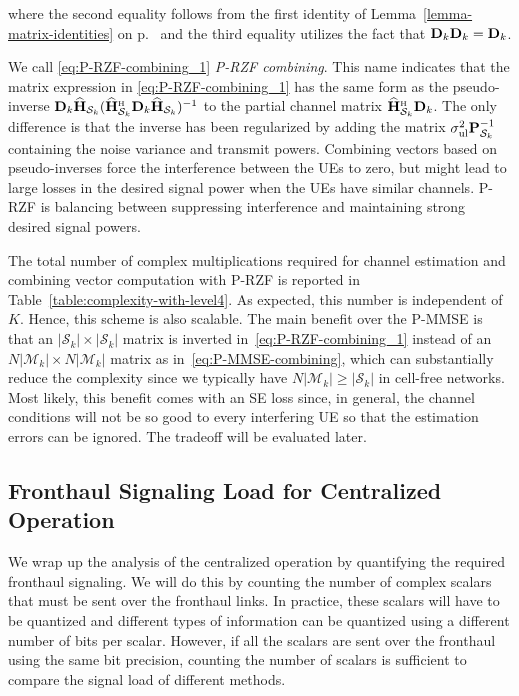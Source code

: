 where the second equality follows from the first identity of Lemma~\ref{lemma-matrix-identities} on p.~\pageref{lemma-matrix-identities} and the third equality utilizes the fact that $\mathbf{{D}}_{k}\mathbf{{D}}_{k} = \mathbf{{D}}_{k}$.

We call \eqref{eq:P-RZF-combining_1} \emph{\gls{P-RZF} combining}. 
This name indicates that the matrix expression in \eqref{eq:P-RZF-combining_1} has the same form as the pseudo-inverse $\vect{{D}}_{k}\vect{\widehat{H}}_{\mathcal{S}_k}( \vect{\widehat{H}}^{\Htran}_{\mathcal{S}_k}\vect{{D}}_{k}\vect{\widehat{H}}_{\mathcal{S}_k} )^{-1}$ to the partial channel matrix $\vect{\widehat{H}}_{\mathcal{S}_k}^{\Htran} \vect{{D}}_{k}$. The only difference is that the inverse has been regularized by adding the matrix $\sigma^2_{\mathrm{ul}} \mathbf{{P}}_{\mathcal{S}_k}^{-1}$ containing the noise variance and transmit powers. Combining vectors based on pseudo-inverses force the interference between the UEs to zero, but might lead to large losses in the desired signal power when the UEs have similar channels. P-RZF is balancing between suppressing interference and maintaining strong desired signal powers.

The total number of complex multiplications required for channel estimation and combining vector computation with P-RZF is reported in Table~\ref{table:complexity-with-level4}. As expected, this number is independent of $K$. Hence, this scheme is also scalable. The main benefit over the P-MMSE is that an $|\mathcal{S}_k| \times |\mathcal{S}_k|$ matrix is inverted in~\eqref{eq:P-RZF-combining_1} instead of an $N|\mathcal{M}_k| \times N|\mathcal{M}_k|$ matrix as in~\eqref{eq:P-MMSE-combining}, which can substantially reduce the complexity since we typically have $N|\mathcal{M}_k| \ge |\mathcal{S}_k|$ in cell-free networks. Most likely, this benefit comes with an SE loss since, in general, the channel conditions will not be so good to every interfering UE so that the estimation errors can be ignored. The tradeoff will be evaluated later.


\subsection{Fronthaul Signaling Load for Centralized Operation}
\label{sec:level4-fronthaul}

We wrap up the analysis of the centralized operation by quantifying the required fronthaul signaling. We will do this by counting the number of complex scalars that must be sent over the fronthaul links. In practice, these scalars will have to be quantized and different types of information can be quantized using a different number of bits per scalar. However, if all the scalars are sent over the fronthaul using the same bit precision, counting the number of scalars is sufficient to compare the  signal load of different methods.

